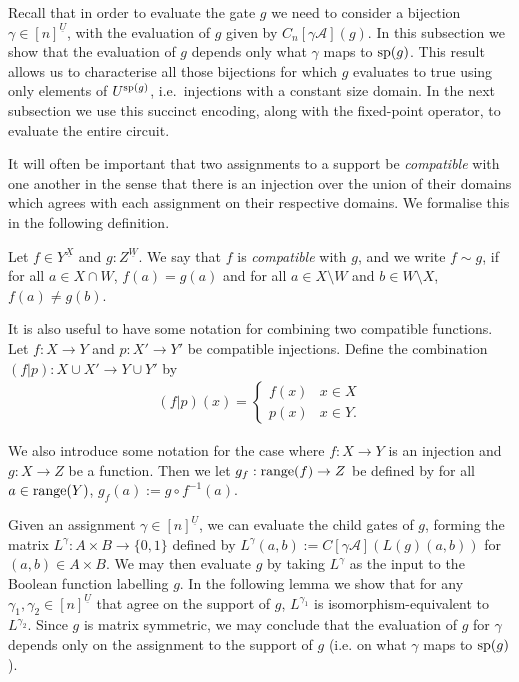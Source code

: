 \documentclass[../paper.tex]{subfiles}
\begin{document}
Recall that in order to evaluate the gate $g$ we need to consider a bijection
$\gamma \in [n]^{\underline{U}}$, with the evaluation of $g$ given by
$C_n[\gamma \mathcal{A}](g)$. In this subsection we show that the evaluation of
$g$ depends only what $\gamma$ maps to $\text{sp}(g)$. This result allows us to
characterise all those bijections for which $g$ evaluates to true using only
elements of $U^{\text{sp}(g)}$, i.e.\ injections with a constant size domain. In the
next subsection we use this succinct encoding, along with the fixed-point
operator, to evaluate the entire circuit.
 
It will often be important that two assignments to a support be
\emph{compatible} with one another in the sense that there is an injection over
the union of their domains which agrees with each assignment on their respective
domains. We formalise this in the following definition.

\begin{definition}
	Let $f \in Y^{\underline{X}}$ and $g : Z^{\underline{W}}$. We say that $f$ is
	\emph{compatible} with $g$, and we write $f \sim g$, if for all $a \in X \cap
	W$, $f(a) = g(a)$ and for all $a \in X \setminus W$ and $b \in W \setminus X$,
	$f(a) \neq g(b)$.
\end{definition}

It is also useful to have some notation for combining two compatible functions.
Let $f : X \rightarrow Y$ and $p: X' \rightarrow Y'$ be compatible injections.
Define the combination $(f | p): X \cup X' \rightarrow Y \cup Y'$ by
\begin{align*}
	(f \vert p) (x) =
	\begin{cases}
	f (x) & x \in X  \\
	p (x) & x \in Y. 
	\end{cases}
\end{align*}

We also introduce some notation for the case where $f: X \rightarrow Y$ is an
injection and $g: X \rightarrow Z$ be a function. Then we let $g_f : \text{range}(f)
\rightarrow Z$ be defined by for all $a \in \text{range}(Y)$, $g_f(a) := g \circ
f^{-1}(a)$.

Given an assignment $\gamma \in [n]^{\underline{U}}$, we can evaluate the child
gates of $g$, forming the matrix $L^{\gamma} : A \times B \rightarrow \{0,1\}$
defined by $L^{\gamma} (a,b) := C[\gamma \mathcal{A}](L(g)(a,b))$ for $(a,b) \in
A \times B$. We may then evaluate $g$ by taking $L^{\gamma}$ as the input to the
Boolean function labelling $g$. In the following lemma we show that for any
$\gamma_1, \gamma_2 \in [n]^{\underline{U}}$ that agree on the support of $g$,
$L^{\gamma_1}$ is isomorphism-equivalent to $L^{\gamma_2}$. Since $g$ is matrix
symmetric, we may conclude that the evaluation of $g$ for $\gamma$ depends only
on the assignment to the support of $g$ (i.e. on what $\gamma$ maps to
$\text{sp}(g)$).
\end{document}
